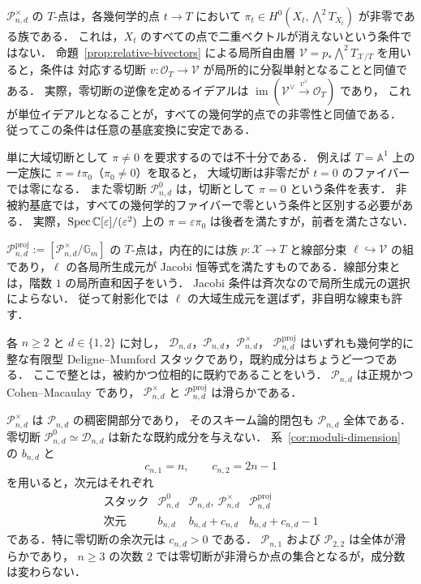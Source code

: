 \begin{remark}[族における非零性と射影化]
\label{rem:familywise-nonzero-poisson}
$\mathcal P_{n,d}^{\times}$ の $T$-点は，各幾何学的点 $t\to T$ において
$\pi_t\in H^0(X_t,\bigwedge^2T_{X_t})$ が非零である族である．
これは，$X_t$ のすべての点で二重ベクトルが消えないという条件ではない．
命題~\ref{prop:relative-bivectors} による局所自由層
$\mathcal V=p_*\bigwedge^2T_{\mathcal X/T}$ を用いると，条件は
対応する切断 $v:\mathcal O_T\to\mathcal V$ が局所的に分裂単射となることと同値である．
実際，零切断の逆像を定めるイデアルは
$\operatorname{im}(\mathcal V^\vee\xrightarrow{v^\vee}\mathcal O_T)$ であり，
これが単位イデアルとなることが，すべての幾何学的点での非零性と同値である．
従ってこの条件は任意の基底変換に安定である．

単に大域切断として $\pi\ne0$ を要求するのでは不十分である．
例えば $T=\mathbb A^1$ 上の一定族に $\pi=t\pi_0$（$\pi_0\ne0$）を取ると，
大域切断は非零だが $t=0$ のファイバーでは零になる．
また零切断 $\mathcal P_{n,d}^{0}$ は，切断として $\pi=0$ という条件を表す．
非被約基底では，すべての幾何学的ファイバーで零という条件と区別する必要がある．
実際，$\operatorname{Spec}\mathbb C[\varepsilon]/(\varepsilon^2)$ 上の $\pi=\varepsilon\pi_0$
は後者を満たすが，前者を満たさない．

$\mathcal P_{n,d}^{\mathrm{proj}}:=[\mathcal P_{n,d}^{\times}/\mathbb G_m]$
の $T$-点は，内在的には族 $p:\mathcal X\to T$ と線部分束
$\ell\hookrightarrow\mathcal V$ の組であり，$\ell$ の各局所生成元が
Jacobi 恒等式を満たすものである．線部分束とは，階数 $1$ の局所直和因子をいう．
Jacobi 条件は斉次なので局所生成元の選択によらない．
従って射影化では $\ell$ の大域生成元を選ばず，非自明な線束も許す．
\end{remark}

\begin{theorem}
\label{thm:poisson-moduli-components}
各 $n\ge2$ と $d\in\{1,2\}$ に対し，
$\mathcal D_{n,d}$，$\mathcal P_{n,d}$，$\mathcal P_{n,d}^{\times}$，
$\mathcal P_{n,d}^{\mathrm{proj}}$ はいずれも幾何学的に整な有限型
Deligne--Mumford スタックであり，既約成分はちょうど一つである．
ここで整とは，被約かつ位相的に既約であることをいう．
$\mathcal P_{n,d}$ は正規かつ Cohen--Macaulay であり，
$\mathcal P_{n,d}^{\times}$ と $\mathcal P_{n,d}^{\mathrm{proj}}$ は滑らかである．

$\mathcal P_{n,d}^{\times}$ は $\mathcal P_{n,d}$ の稠密開部分であり，
そのスキーム論的閉包も $\mathcal P_{n,d}$ 全体である．
零切断 $\mathcal P_{n,d}^{0}\simeq\mathcal D_{n,d}$ は新たな既約成分を与えない．
系~\ref{cor:moduli-dimension} の $b_{n,d}$ と
\[
 c_{n,1}=n,\qquad c_{n,2}=2n-1
\]
を用いると，次元はそれぞれ
\[
\begin{array}{c|c|c|c}
 \text{スタック}&\mathcal P_{n,d}^{0}&
 \mathcal P_{n,d},\ \mathcal P_{n,d}^{\times}&\mathcal P_{n,d}^{\mathrm{proj}}\\ \hline
 \text{次元}&b_{n,d}&b_{n,d}+c_{n,d}&b_{n,d}+c_{n,d}-1
\end{array}
\]
である．特に零切断の余次元は $c_{n,d}>0$ である．
$\mathcal P_{n,1}$ および $\mathcal P_{2,2}$ は全体が滑らかであり，
$n\ge3$ の次数 $2$ では零切断が非滑らか点の集合となるが，成分数は変わらない．
\end{theorem}

